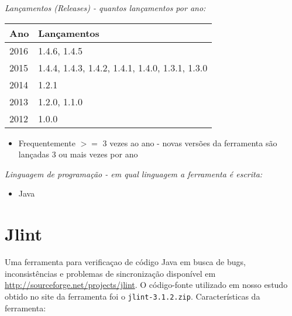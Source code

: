\begin{description}

  \item {\it Lançamentos ({\it Releases}) - quantos lançamentos por ano:}
    \begin{table}[h!]
      \centering
      \begin{tabular}{| l | l |}
        \hline
        Ano  & Lançamentos                                     \\
        \hline
        2016 & 1.4.6, 1.4.5                                    \\
        2015 & 1.4.4, 1.4.3, 1.4.2, 1.4.1, 1.4.0, 1.3.1, 1.3.0 \\
        2014 & 1.2.1                                           \\
        2013 & 1.2.0, 1.1.0                                    \\
        2012 & 1.0.0                                           \\
        \hline
      \end{tabular}
    \end{table}
    \begin{itemize}
      \item Frequentemente $>=$ 3 vezes ao ano - novas versões da ferramenta são lançadas 3 ou mais vezes por ano
    \end{itemize}

  \item {\it Linguagem de programação - em qual linguagem a ferramenta é escrita:}
    \begin{itemize}
      \item Java
    \end{itemize}

\end{description}

\section{Jlint}

Uma ferramenta para verificaçao de código Java em busca de bugs,
inconsistências e problemas de sincronização disponível em
\url{http://sourceforge.net/projects/jlint}.  O código-fonte utilizado em
nosso estudo obtido no site da ferramenta foi o \texttt{jlint-3.1.2.zip}.
Características da ferramenta:

